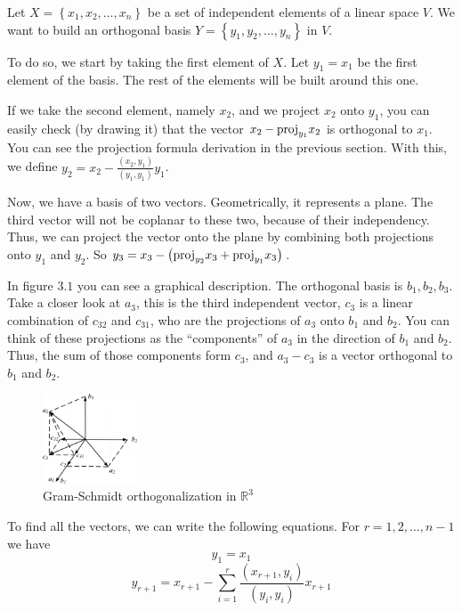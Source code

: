 \documentclass{book}
\begin{document}
Let $X=\left\{x_1, x_2,\dots,x_n\right\}$ be a set of independent elements of a
linear space $V$. We want to build an orthogonal basis
$Y=\left\{y_1,y_2,\dots,y_n\right\}$ in $V$.

To do so, we start by taking the first element of $X$. Let $y_1 = x_1$ be the
first element of the basis. The rest of the elements will be built around this
one.

If we take the second element, namely $x_2$, and we project $x_2$ onto $y_1$,
you can easily check (by drawing it) that the vector $x_2 -
    \textnormal{proj}_{y_1}{x_2}$ is orthogonal to $x_1$. You can see the
projection formula derivation in the previous section. With this, we define
$y_2 = x_2 - \frac{\left(x_2,y_1\right)}{\left(y_1,y_1\right)}y_1$.

Now, we have a basis of two vectors. Geometrically, it represents a plane. The
third vector will not be coplanar to these two, because of their independency.
Thus, we can project the vector onto the plane by combining both projections
onto $y_1$ and $y_2$. So $y_3 = x_3 - \left(\textnormal{proj}_{y_2}{x_3}+
    \textnormal{proj}_{y_1}{x_3}\right)$.

In figure $3.1$ you can see a graphical description. The orthogonal basis is
$b_1,b_2,b_3$. Take a closer look at $a_3$, this is the third independent
vector, $c_3$ is a linear combination of $c_{32}$ and $c_{31}$, who are the
projections of $a_3$ onto $b_1$ and $b_2$. You can think of these projections
as the ``components'' of $a_3$ in the direction of $b_1$ and $b_2$. Thus, the
sum of those components form $c_3$, and $a_3 - c_3$ is a vector orthogonal to
$b_1$ and $b_2$.

\begin{figure}
    \caption{Gram-Schmidt orthogonalization in $\mathbb{R}^{3}$}
    \centering
    \includegraphics[width=0.25\textwidth]{An-illustration-of-Gram-Schmidt-transformation}
\end{figure}

To find all the vectors, we can write the following equations. For $r = 1, 2,
    \dots, n-1$ we have
\begin{equation}
    y_1 = x_1
\end{equation}
\begin{equation}
    y_{r+1} = x_{r+1} - \sum_{i=1}^{r}{\dfrac{\left(x_{r+1}, y_i\right)}{\left(y_i, y_i\right)}x_{r+1}}
\end{equation}
\end{document}
